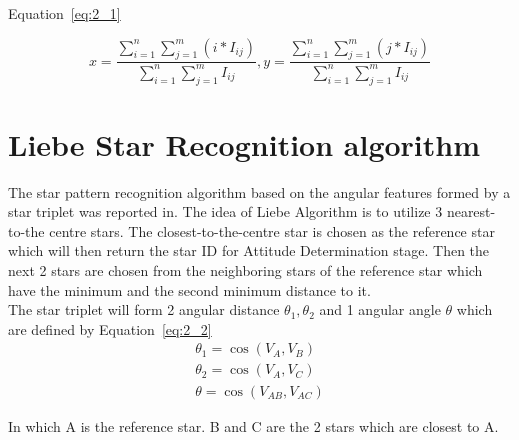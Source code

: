 
\noindent Equation~\ref{eq:2_1}

\begin{equation} %
	x = \frac{\displaystyle\sum_{i=1}^{n} \displaystyle\sum_{j=1}^{m} (i * I_{ij})} {\displaystyle\sum_{i=1}^{n} \displaystyle\sum_{j=1}^{m} I_{ij}}, y = \frac{\displaystyle\sum_{i=1}^{n} \displaystyle\sum_{j=1}^{m} (j * I_{ij})} {\displaystyle\sum_{i=1}^{n} \displaystyle\sum_{j=1}^{m} I_{ij}}
	\label{eq:2_1}
\end{equation}

\section{Liebe Star Recognition algorithm}

The star pattern recognition algorithm based on the angular features formed by a star triplet was reported in\cite{edseee.38797119950101,edseee.18038319930101,000176062300018n.d.,edseee.103539620020101,edseee.79314719990101}. The idea of Liebe Algorithm is to utilize 3 nearest-to-the centre stars. The closest-to-the-centre star is chosen as the reference star which will then return the star ID for Attitude Determination stage. Then the next 2 stars are chosen from the neighboring stars of the reference star which have the minimum and the second minimum distance to it. \\

\noindent The star triplet will form 2 angular distance $\theta_1, \theta_2$ and 1 angular angle $\theta$ which are defined by Equation~\ref{eq:2_2}
\begin{equation}
	\begin{aligned}
		\theta_1 = \cos(V_A, V_B) \\
		\theta_2 = \cos(V_A, V_C) \\
		\theta = \cos(V_{AB}, V_{AC})
	\end{aligned}
	\label{eq:2_2}
\end{equation}

\noindent In which A is the reference star. B and C are the 2 stars which are closest to A. \\



